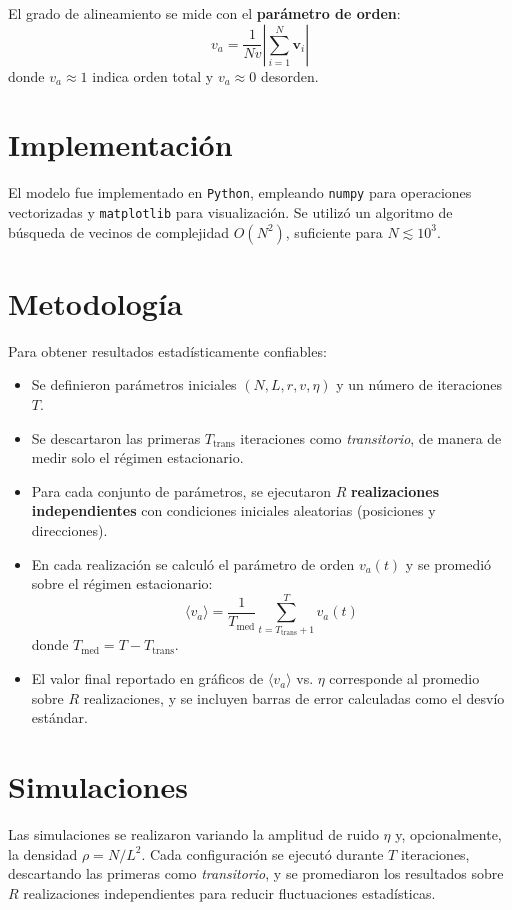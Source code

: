 \documentclass[12pt,a4paper]{article}
\begin{document}
El grado de alineamiento se mide con el \textbf{parámetro de orden}:
\begin{equation}
    v_a = \frac{1}{N v} \left| \sum_{i=1}^N \bm{v}_i \right|
    \label{eq:va}
\end{equation}
donde $v_a \approx 1$ indica orden total y $v_a \approx 0$ desorden.

\section{Implementación}
El modelo fue implementado en \texttt{Python}, empleando \texttt{numpy} para operaciones vectorizadas y \texttt{matplotlib} para visualización.  
Se utilizó un algoritmo de búsqueda de vecinos de complejidad $O(N^2)$, suficiente para $N \lesssim 10^3$.

\section{Metodología}
Para obtener resultados estadísticamente confiables:
\begin{itemize}
    \item Se definieron parámetros iniciales $(N, L, r, v, \eta)$ y un número de iteraciones $T$.
    \item Se descartaron las primeras $T_{\mathrm{trans}}$ iteraciones como \textit{transitorio}, de manera de medir solo el régimen estacionario.
    \item Para cada conjunto de parámetros, se ejecutaron $R$ \textbf{realizaciones independientes} con condiciones iniciales aleatorias (posiciones y direcciones).
    \item En cada realización se calculó el parámetro de orden $v_a(t)$ y se promedió sobre el régimen estacionario:
    \begin{equation}
        \langle v_a \rangle = \frac{1}{T_{\mathrm{med}}} \sum_{t=T_{\mathrm{trans}}+1}^{T} v_a(t)
        \label{eq:promedio_va}
    \end{equation}
    donde $T_{\mathrm{med}} = T - T_{\mathrm{trans}}$.
    \item El valor final reportado en gráficos de $\langle v_a \rangle$ vs. $\eta$ corresponde al promedio sobre $R$ realizaciones, y se incluyen barras de error calculadas como el desvío estándar.
\end{itemize}

\section{Simulaciones}
Las simulaciones se realizaron variando la amplitud de ruido $\eta$ y, opcionalmente, la densidad $\rho = N/L^2$.  
Cada configuración se ejecutó durante $T$ iteraciones, descartando las primeras como \textit{transitorio}, y se promediaron los resultados sobre $R$ realizaciones independientes para reducir fluctuaciones estadísticas.
\end{document}
